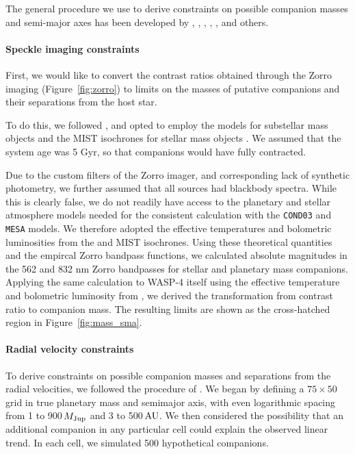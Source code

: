 \documentclass[12pt,twocolumn,tighten]{aastex62}
\begin{document}
The general procedure we use to derive constraints on possible
companion masses and semi-major axes has been developed by
\citet{wright_linear_trends_2007}, \citet{crepp_trends_2012},
\citet{montet_trends_2014}, \citet{knutson_friends_2014},
\citet{bryan_statistics_2016,bryan_excess_2019}, and others.

\paragraph{Speckle imaging constraints}

First, we would like to convert the contrast ratios obtained through
the Zorro imaging (Figure~\ref{fig:zorro}) to limits on the masses of
putative companions and their separations from the host star.

To do this, we followed \citet{montet_trends_2014}, and opted to
employ the \citet{baraffe_evolutionary_2003} models for substellar
mass objects and the MIST isochrones for stellar mass objects
\citep{paxton_modules_2011,paxton_modules_2013,paxton_modules_2015,dotter_mesa_2016,choi_mesa_2016}.
We assumed that the system age was 5 Gyr, so that companions would
have fully contracted.

Due to the custom filters of the Zorro imager, and corresponding lack
of synthetic photometry, we further assumed that all sources had
blackbody spectra. While this is clearly false, we do not readily have
access to the planetary and stellar atmosphere models needed for the
consistent calculation with the \texttt{COND03} and \texttt{MESA}
models.  We therefore adopted the effective temperatures and
bolometric luminosities from the \citet{baraffe_evolutionary_2003} and
MIST isochrones.  Using these theoretical quantities and the empircal
Zorro bandpass functions, we calculated absolute magnitudes in the 562
and 832 nm Zorro bandpasses for stellar and planetary mass companions.
Applying the same calculation to WASP-4 itself using the effective
temperature and bolometric luminosity from
, we derived the transformation from
contrast ratio to companion mass.  The resulting limits are shown as
the cross-hatched region in Figure~\ref{fig:mass_sma}.


\paragraph{Radial velocity constraints}

To derive constraints on possible companion masses and separations
from the radial velocities, we followed the procedure of
\citet{bryan_excess_2019}.  We began by defining a $75\times50$ grid
in true planetary mass and semimajor axis, with even logarithmic
spacing from 1 to 900$\,$$M_{\rm Jup}$ and 3 to 500$\,$${\rm AU}$.  We
then considered the possibility that an additional companion in any
particular cell could explain the observed linear trend.  In each
cell, we simulated 500 hypothetical companions.
\end{document}
